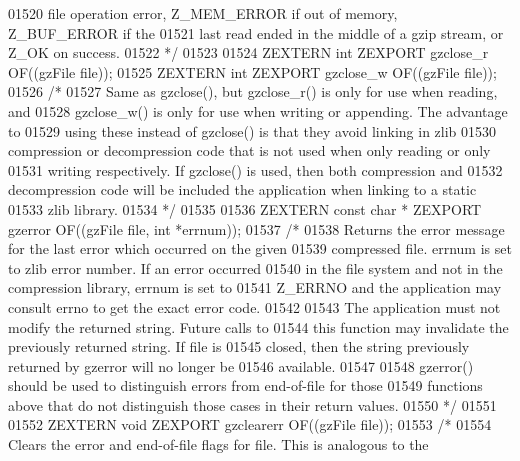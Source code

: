 \begin{DoxyCode}
01520 \textcolor{comment}{   file operation error, Z\_MEM\_ERROR if out of memory, Z\_BUF\_ERROR if the}
01521 \textcolor{comment}{   last read ended in the middle of a gzip stream, or Z\_OK on success.}
01522 \textcolor{comment}{*/}
01523 
01524 ZEXTERN \textcolor{keywordtype}{int} ZEXPORT gzclose\_r OF((gzFile file));
01525 ZEXTERN \textcolor{keywordtype}{int} ZEXPORT gzclose\_w OF((gzFile file));
01526 \textcolor{comment}{/*}
01527 \textcolor{comment}{     Same as gzclose(), but gzclose\_r() is only for use when reading, and}
01528 \textcolor{comment}{   gzclose\_w() is only for use when writing or appending.  The advantage to}
01529 \textcolor{comment}{   using these instead of gzclose() is that they avoid linking in zlib}
01530 \textcolor{comment}{   compression or decompression code that is not used when only reading or only}
01531 \textcolor{comment}{   writing respectively.  If gzclose() is used, then both compression and}
01532 \textcolor{comment}{   decompression code will be included the application when linking to a static}
01533 \textcolor{comment}{   zlib library.}
01534 \textcolor{comment}{*/}
01535 
01536 ZEXTERN \textcolor{keyword}{const} \textcolor{keywordtype}{char} * ZEXPORT gzerror OF((gzFile file, \textcolor{keywordtype}{int} *errnum));
01537 \textcolor{comment}{/*}
01538 \textcolor{comment}{     Returns the error message for the last error which occurred on the given}
01539 \textcolor{comment}{   compressed file.  errnum is set to zlib error number.  If an error occurred}
01540 \textcolor{comment}{   in the file system and not in the compression library, errnum is set to}
01541 \textcolor{comment}{   Z\_ERRNO and the application may consult errno to get the exact error code.}
01542 \textcolor{comment}{}
01543 \textcolor{comment}{     The application must not modify the returned string.  Future calls to}
01544 \textcolor{comment}{   this function may invalidate the previously returned string.  If file is}
01545 \textcolor{comment}{   closed, then the string previously returned by gzerror will no longer be}
01546 \textcolor{comment}{   available.}
01547 \textcolor{comment}{}
01548 \textcolor{comment}{     gzerror() should be used to distinguish errors from end-of-file for those}
01549 \textcolor{comment}{   functions above that do not distinguish those cases in their return values.}
01550 \textcolor{comment}{*/}
01551 
01552 ZEXTERN \textcolor{keywordtype}{void} ZEXPORT gzclearerr OF((gzFile file));
01553 \textcolor{comment}{/*}
01554 \textcolor{comment}{     Clears the error and end-of-file flags for file.  This is analogous to the}

\end{DoxyCode}
